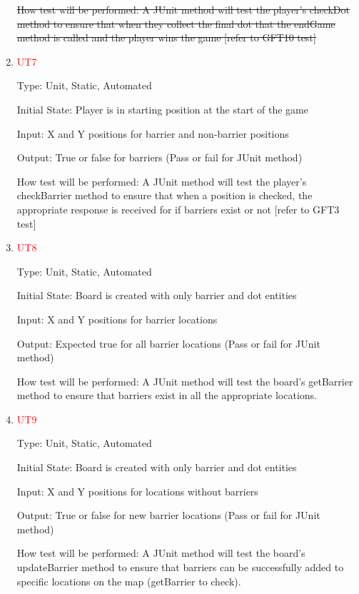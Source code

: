 \documentclass[12pt, titlepage]{article}
\begin{document}
\begin{enumerate}
\sout{How test will be performed: A JUnit method will test the player's checkDot method to ensure that when they collect the final dot that the endGame method is called and the player wins the game [refer to GFT10 test]}


\item{\textcolor{red}{UT7}\\}

Type: Unit, Static, Automated
					
Initial State: Player is in starting position at the start of the game
					
Input: X and Y positions for barrier and non-barrier positions
					
Output: True or false for barriers (Pass or fail for JUnit method)
					
How test will be performed: A JUnit method will test the player's checkBarrier method to ensure that when a position is checked, the appropriate response is received for if barriers exist or not [refer to GFT3 test]

\item{\textcolor{red}{UT8}\\}

Type: Unit, Static, Automated
					
Initial State: Board is created with only barrier and dot entities
					
Input: X and Y positions for barrier locations
					
Output: Expected true for all barrier locations (Pass or fail for JUnit method)
					
How test will be performed: A JUnit method will test the board's getBarrier method to ensure that barriers exist in all the appropriate locations.

\item{\textcolor{red}{UT9}\\}

Type: Unit, Static, Automated
					
Initial State: Board is created with only barrier and dot entities
					
Input: X and Y positions for locations without barriers
					
Output: True or false for new barrier locations (Pass or fail for JUnit method)
					
How test will be performed: A JUnit method will test the board's updateBarrier method to ensure that barriers can be successfully added to specific locations on the map (getBarrier to check).


\end{enumerate}
\end{document}
